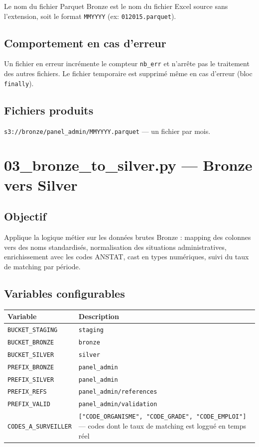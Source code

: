\documentclass[12pt,a4paper,french]{report}
\newcommand{\bucket}[1]{\texttt{s3://#1}}
\begin{document}
Le nom du fichier Parquet Bronze est le nom du fichier Excel source sans
l'extension, soit le format \texttt{MMYYYY} (ex: \texttt{012015.parquet}).

\subsection{Comportement en cas d'erreur}

Un fichier en erreur incrémente le compteur \texttt{nb\_err} et n'arrête
pas le traitement des autres fichiers. Le fichier temporaire est supprimé
même en cas d'erreur (bloc \texttt{finally}).

\subsection{Fichiers produits}

\bucket{bronze/panel\_admin/MMYYYY.parquet} — un fichier par mois.

\section{03\_bronze\_to\_silver.py — Bronze vers Silver}

\subsection{Objectif}

Applique la logique métier sur les données brutes Bronze : mapping des
colonnes vers des noms standardisés, normalisation des situations
administratives, enrichissement avec les codes ANSTAT, cast en types
numériques, suivi du taux de matching par période.

\subsection{Variables configurables}

\begin{tabularx}{\textwidth}{lX}
  \toprule
  \textbf{Variable} & \textbf{Description} \\
  \midrule
  \texttt{BUCKET\_STAGING} & \texttt{staging} \\
  \texttt{BUCKET\_BRONZE} & \texttt{bronze} \\
  \texttt{BUCKET\_SILVER} & \texttt{silver} \\
  \texttt{PREFIX\_BRONZE} & \texttt{panel\_admin} \\
  \texttt{PREFIX\_SILVER} & \texttt{panel\_admin} \\
  \texttt{PREFIX\_REFS} & \texttt{panel\_admin/references} \\
  \texttt{PREFIX\_VALID} & \texttt{panel\_admin/validation} \\
  \texttt{CODES\_A\_SURVEILLER} &
    \texttt{["CODE\_ORGANISME", "CODE\_GRADE", "CODE\_EMPLOI"]} ---
    codes dont le taux de matching est loggué en temps réel \\
  \bottomrule
\end{tabularx}
\end{document}
